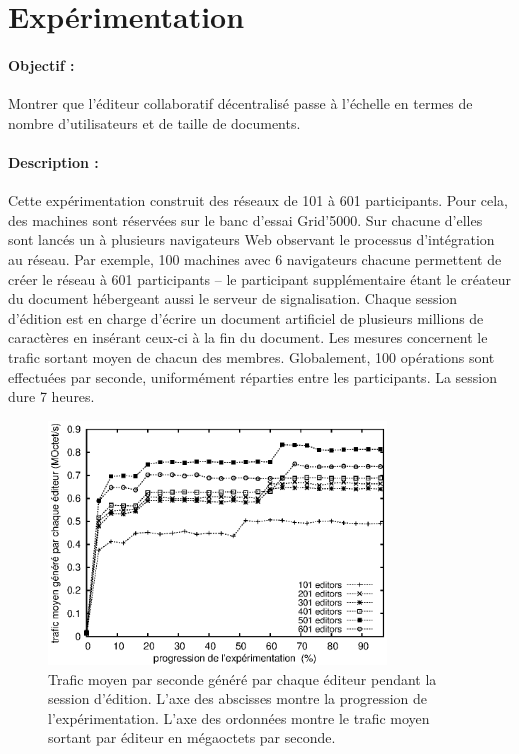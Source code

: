 
\section{Expérimentation}
\label{editor:sec:experimentation}

\paragraph{Objectif :} Montrer que l'éditeur collaboratif décentralisé \CRATE
passe à l'échelle en termes de nombre d'utilisateurs et de taille de
documents.

\paragraph{Description :} Cette expérimentation construit des réseaux de 101 à
601 participants. Pour cela, des machines sont réservées sur le banc d'essai
Grid'5000. Sur chacune d'elles sont lancés un à plusieurs navigateurs Web
observant le processus d'intégration au réseau. Par exemple, 100 machines avec 6
navigateurs chacune permettent de créer le réseau à 601 participants -- le
participant supplémentaire étant le créateur du document hébergeant aussi le
serveur de signalisation.  Chaque session d'édition est en charge d'écrire un
document artificiel de plusieurs millions de caractères en insérant ceux-ci à la
fin du document. Les mesures concernent le trafic sortant moyen de chacun des
membres. Globalement, 100 opérations sont effectuées par seconde, uniformément
réparties entre les participants. La session dure 7 heures.

\begin{figure}
  \begin{center}
    \includegraphics[width=0.8\textwidth]{img/editor/communication.eps}
    \caption[Trafic généré par \CRATE lors de sessions d'édition]
    {\label{editor:img:communication} Trafic moyen par seconde généré par chaque
      éditeur pendant la session d'édition. L'axe des abscisses montre la
      progression de l'expérimentation. L'axe des ordonnées montre le trafic
      moyen sortant par éditeur en mégaoctets par seconde.}
  \end{center}
\end{figure}

